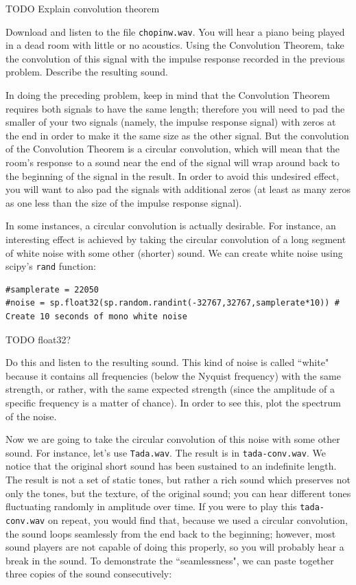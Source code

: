 TODO Explain convolution theorem
\begin{problem}\label{convolution_problem}
Download and listen to the file \texttt{chopinw.wav}. You will hear a piano being played in a dead room with little or no acoustics. Using the Convolution Theorem, take the convolution of this signal with the impulse response recorded in the previous problem. Describe the resulting sound.
\end{problem}

In doing the preceding problem, keep in mind that the Convolution Theorem requires both signals to have the same length; therefore you will need to pad the smaller of your two signals (namely, the impulse response signal) with zeros at the end in order to make it the same size as the other signal. But the convolution of the Convolution Theorem is a circular convolution, which will mean that the room's response to a sound near the end of the signal will wrap around back to the beginning of the signal in the result. In order to avoid this undesired effect, you will want to also pad the signals with additional zeros (at least as many zeros as one less than the size of the impulse response signal).

In some instances, a circular convolution is actually desirable. For instance, an interesting effect is achieved by taking the circular convolution of a long segment of white noise with some other (shorter) sound. We can create white noise using scipy's \texttt{rand} function:
\begin{lstlisting}
#samplerate = 22050
#noise = sp.float32(sp.random.randint(-32767,32767,samplerate*10)) # Create 10 seconds of mono white noise
\end{lstlisting}

TODO float32?

\begin{problem}
Do this and listen to the resulting sound.  This kind of noise is called ``white" because it contains all frequencies (below the Nyquist frequency) with the same strength, or rather, with the same expected strength (since the amplitude of a specific frequency is a matter of chance). In order to see this, plot the spectrum of the noise.
\end{problem}

Now we are going to take the circular convolution of this noise with some other sound. For instance, let's use \texttt{Tada.wav}. The result is in \texttt{tada-conv.wav}. We notice that the original short sound has been sustained to an indefinite length. The result is not a set of static tones, but rather a rich sound which preserves not only the tones, but the texture, of the original sound; you can hear different tones fluctuating randomly in amplitude over time. If you were to play this \texttt{tada-conv.wav} on repeat, you would find that, because we used a circular convolution, the sound loops seamlessly from the end back to the beginning; however, most sound players are not capable of doing this properly, so you will probably hear a break in the sound. To demonstrate the ``seamlessness", we can paste together three copies of the sound consecutively:

